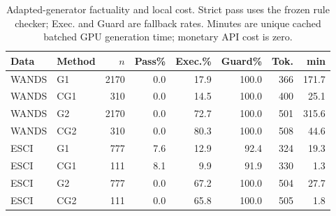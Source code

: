 \begin{table}[t]\caption{Adapted-generator factuality and local cost. Strict pass uses the frozen rule checker; Exec. and Guard are fallback rates. Minutes are unique cached batched GPU generation time; monetary API cost is zero.}\label{tab:optfacts}\centering\scriptsize
\begin{tabular}{llrrrrrr}\toprule Data&Method&$n$&Pass\%&Exec.\%&Guard\%&Tok.&min\\\midrule
WANDS & G1 & 2170 & 0.0 & 17.9 & 100.0 & 366 & 171.7\\
WANDS & CG1 & 310 & 0.0 & 14.5 & 100.0 & 400 & 25.1\\
WANDS & G2 & 2170 & 0.0 & 72.7 & 100.0 & 501 & 315.6\\
WANDS & CG2 & 310 & 0.0 & 80.3 & 100.0 & 508 & 44.6\\
ESCI & G1 & 777 & 7.6 & 12.9 & 92.4 & 324 & 19.3\\
ESCI & CG1 & 111 & 8.1 & 9.9 & 91.9 & 330 & 1.3\\
ESCI & G2 & 777 & 0.0 & 67.2 & 100.0 & 504 & 27.7\\
ESCI & CG2 & 111 & 0.0 & 65.8 & 100.0 & 505 & 1.8\\
\bottomrule\end{tabular}\end{table}
